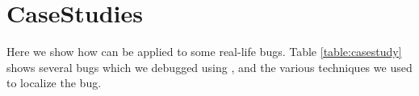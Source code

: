 \section{CaseStudies}
\label{sec:casestudy}

Here we show how \parikshan can be applied to some real-life bugs.
Table \ref{table:casestudy} shows several bugs which we debugged using \parikshan, and the various techniques we used to localize the bug.

